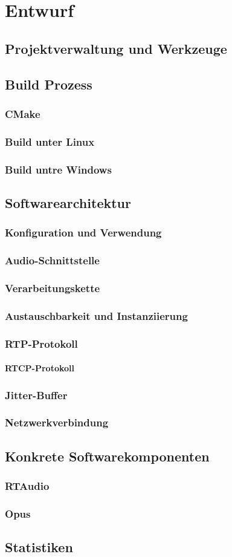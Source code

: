 \chapter{Entwurf}
\section{Projektverwaltung und Werkzeuge}
\section{Build Prozess}
\subsection{CMake}
\subsection{Build unter Linux}
\subsection{Build untre Windows}
\section{Softwarearchitektur}
\subsection{Konfiguration und Verwendung}
\subsection{Audio-Schnittstelle}
\subsection{Verarbeitungskette}
\subsection{Austauschbarkeit und Instanziierung}
\subsection{RTP-Protokoll}
\subsubsection{RTCP-Protokoll}
\subsection{Jitter-Buffer}
\subsection{Netzwerkverbindung}
\section{Konkrete Softwarekomponenten}
\subsection{RTAudio}
\subsection{Opus}
\section{Statistiken}
